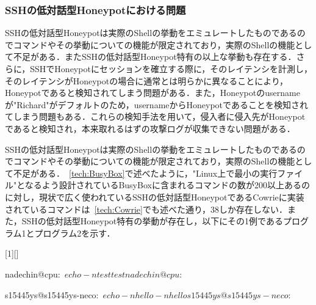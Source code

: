 \subsubsection{SSHの低対話型Honeypotにおける問題}
\label{appr:problemofSshLowHoneypot}
SSHの低対話型Honeypotは実際のShellの挙動をエミュレートしたものであるのでコマンドやその挙動についての機能が限定されており，実際のShellの機能として不足がある．またSSHの低対話型Honeypot特有の以上な挙動も存在する．さらに，SSHでHoneypotにセッションを確立する際に，そのレイテンシを計測し，そのレイテンシがHoneypotの場合に通常とは明らかに異なることにより，Honeypotであると検知されてしまう問題がある．また，Honeypotのusernameが"Richard"がデフォルトのため，usernameからHoneypotであることを検知されてしまう問題もある．これらの検知手法を用いて，侵入者に侵入先がHoneypotであると検知され，本来取れるはずの攻撃ログが収集できない問題がある．

\label{appr:LowHoneypotLatency}

\label{appr:LowHoneypotUsername}

\label{appr:LowHoneypotCommand}
SSHの低対話型Honeypotは実際のShellの挙動をエミュレートしたものであるのでコマンドやその挙動についての機能が限定されており，実際のShellの機能として不足がある．~\ref{tech:BusyBox}で述べたように，"Linux上で最小の実行ファイル"となるよう設計されているBusyBoxに含まれるコマンドの数が200以上あるのに対し，現状で広く使われているSSHの低対話型HoneypotであるCowrieに実装されているコマンドは~\ref{tech:Cowrie}でも述べた通り，38しか存在しない．また，SSHの低対話型Honeypot特有の挙動が存在し，以下にその1例であるプログラム\，1とプログラム\，2を示す．

\vspace{5mm}
[1][]
    {\lstset{
        frame=single,
        basicstyle=\ttfamily,
        numbers=left,
        numbersep=10pt,
        tabsize=2,
        extendedchars=true,
        xleftmargin=17pt,
        framexleftmargin=17pt,
        #1
    }
}{}

\begin{mylisting}[language=sh,caption=正しいShellの挙動]
nadechin@cpu:~$ echo -n test
testnadechin@cpu:~$
\end{mylisting}

\begin{mylisting}[language=sh,caption=Kippo特有の異常な挙動の例]
s15445ys@s15445ys-neco:~$ echo -n hello
-n hello
s15445ys@s15445ys-neco:~$
\end{mylisting}

